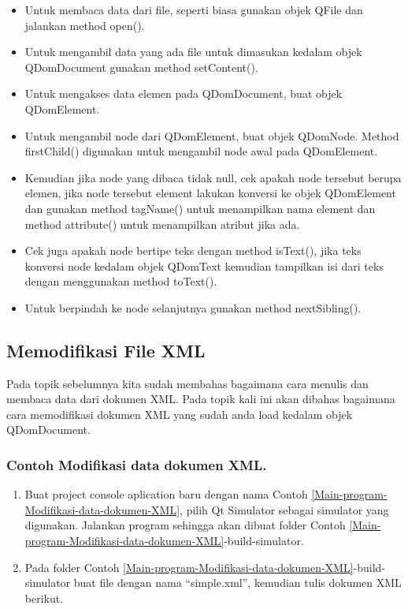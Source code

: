 \begin{itemize}

\item
  Untuk membaca data dari file, seperti biasa gunakan objek QFile dan
  jalankan method open().
\item
  Untuk mengambil data yang ada file untuk dimasukan kedalam objek
  QDomDocument gunakan method setContent().
\item
  Untuk mengakses data elemen pada QDomDocument, buat objek QDomElement.
\item
  Untuk mengambil node dari QDomElement, buat objek QDomNode. Method
  firstChild() digunakan untuk mengambil node awal pada QDomElement.
\item
  Kemudian jika node yang dibaca tidak null, cek apakah node tersebut
  berupa elemen, jika node tersebut element lakukan konversi ke objek
  QDomElement dan gunakan method tagName() untuk menampilkan nama
  element dan method attribute() untuk menampilkan atribut jika ada.
\item
  Cek juga apakah node bertipe teks dengan method isText(), jika teks
  konversi node kedalam objek QDomText kemudian tampilkan isi dari teks
  dengan menggunakan method toText().
\item
  Untuk berpindah ke node selanjutnya gunakan method nextSibling().
\end{itemize}

\subsection{Memodifikasi File XML}\label{memodifikasi-file-xml}

Pada topik sebelumnya kita sudah membahas bagaimana cara menulis dan
membaca data dari dokumen XML. Pada topik kali ini akan dibahas
bagaimana cara memodifikasi dokumen XML yang sudah anda load kedalam
objek QDomDocument.

\subsubsection*{Contoh  Modifikasi data dokumen XML.}

\begin{enumerate}


\item
  Buat project console aplication baru dengan nama Contoh \ref{Main-program-Modifikasi-data-dokumen-XML}, pilih Qt
  Simulator sebagai simulator yang digunakan. Jalankan program sehingga
  akan dibuat folder Contoh \ref{Main-program-Modifikasi-data-dokumen-XML}-build-simulator.
\item
  Pada folder Contoh \ref{Main-program-Modifikasi-data-dokumen-XML}-build-simulator buat file dengan nama
  ``simple.xml'', kemudian tulis dokumen XML berikut.
\end{enumerate}

